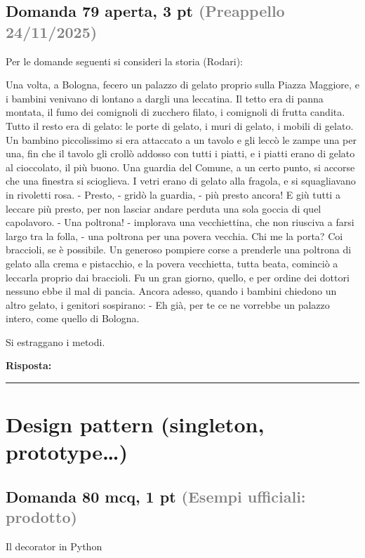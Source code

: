 \documentclass[a4paper,11pt]{article}
\begin{document}
\subsection*{Domanda 79 \hfill {\small aperta, 3 pt \textcolor{gray}{(Preappello 24/11/2025)}}}
\begin{tcolorbox}[colback=gray!8,colframe=gray!50,title=Contesto]
Per le domande seguenti si consideri la storia (Rodari):

Una volta, a Bologna, fecero un palazzo di gelato proprio sulla Piazza Maggiore, e i bambini venivano di lontano a dargli una leccatina. Il tetto era di panna montata, il fumo dei comignoli di zucchero filato, i comignoli di frutta candita. Tutto il resto era di gelato: le porte di gelato, i muri di gelato, i mobili di gelato. Un bambino piccolissimo si era attaccato a un tavolo e gli leccò le zampe una per una, fin che il tavolo gli crollò addosso con tutti i piatti, e i piatti erano di gelato al cioccolato, il più buono. Una guardia del Comune, a un certo punto, si accorse che una finestra si scioglieva. I vetri erano di gelato alla fragola, e si squagliavano in rivoletti rosa. - Presto, - gridò la guardia, - più presto ancora! E giù tutti a leccare più presto, per non lasciar andare perduta una sola goccia di quel capolavoro. - Una poltrona! - implorava una vecchiettina, che non riusciva a farsi largo tra la folla, - una poltrona per una povera vecchia. Chi me la porta? Coi braccioli, se è possibile. Un generoso pompiere corse a prenderle una poltrona di gelato alla crema e pistacchio, e la povera vecchietta, tutta beata, cominciò a leccarla proprio dai braccioli. Fu un gran giorno, quello, e per ordine dei dottori nessuno ebbe il mal di pancia. Ancora adesso, quando i bambini chiedono un altro gelato, i genitori sospirano: - Eh già, per te ce ne vorrebbe un palazzo intero, come quello di Bologna.
\end{tcolorbox}
Si estraggano i metodi.

\vspace{0.2cm}
\noindent\textbf{Risposta:}\par
\vspace{4cm}\hrule


\section{Design pattern (singleton, prototype…)}

\subsection*{Domanda 80 \hfill {\small mcq, 1 pt \textcolor{gray}{(Esempi ufficiali: prodotto)}}}
Il decorator in Python
\end{document}
